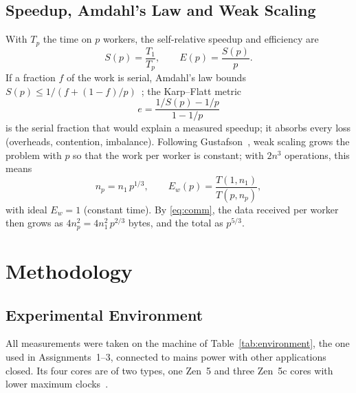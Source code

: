\documentclass[conference,a4paper]{IEEEtran}
\begin{document}
\subsection{Speedup, Amdahl's Law and Weak Scaling}
With $T_p$ the time on $p$ workers, the self-relative speedup and efficiency are
\begin{equation}
  S(p) = \frac{T_1}{T_p}, \qquad E(p) = \frac{S(p)}{p}.
  \label{eq:speedup}
\end{equation}
If a fraction $f$ of the work is serial, Amdahl's law bounds
$S(p) \le 1/(f + (1-f)/p)$~\cite{amdahl1967}; the Karp--Flatt
metric~\cite{karp1990}
\begin{equation}
  e = \frac{1/S(p) - 1/p}{1 - 1/p}
  \label{eq:karpflatt}
\end{equation}
is the serial fraction that would explain a measured speedup; it absorbs every
loss (overheads, contention, imbalance). Following
Gustafson~\cite{gustafson1988}, weak scaling grows the problem with $p$ so that
the work per worker is constant; with $2n^3$ operations, this means
\begin{equation}
  n_p = n_1\, p^{1/3}, \qquad E_w(p) = \frac{T(1, n_1)}{T(p, n_p)},
  \label{eq:weak}
\end{equation}
with ideal $E_w = 1$ (constant time). By \eqref{eq:comm}, the data received per
worker then grows as $4n_p^2 = 4n_1^2\, p^{2/3}$ bytes, and the total as
$p^{5/3}$.

\section{Methodology}
\label{sec:method}

\subsection{Experimental Environment}
\label{sec:environment}
All measurements were taken on the machine of Table~\ref{tab:environment}, the
one used in Assignments~1--3, connected to mains power with other applications
closed. Its four cores are of two types, one Zen~5 and three Zen~5c cores with
lower maximum clocks~\cite{nbc330}.
\end{document}
